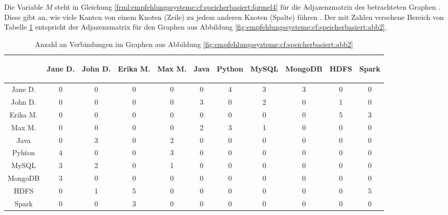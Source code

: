 Die Variable $M$ steht in Gleichung \ref{frml:empfehlungssysteme:cf:speicherbasiert:formel4} für die Adjazenzmatrix des betrachteten Graphen \cite[S. 4]{libenNowell:2007}. Diese gibt an, wie viele Kanten von einem Knoten (Zeile) zu jedem anderen Knoten (Spalte) führen \cite[S. 6]{guns:2014}. Der mit Zahlen versehene Bereich von Tabelle \ref{tbl:empfehlungssysteme:arbeitsweise:tbl2} entspricht der Adjazenzmatrix für den Graphen aus Abbildung \ref{fig:empfehlungssysteme:cf:speicherbasiert:abb2}.

\begin{table}[h]
	\centering
	\begin{tabular}{c|c|c|c|c|c|c|c|c|c|c}
		& \begin{sideways}Jane D.\end{sideways} & \begin{sideways}John D.\end{sideways} & \begin{sideways}Erika M.\end{sideways} & \begin{sideways}Max M.\end{sideways} & \begin{sideways}Java\end{sideways} & \begin{sideways}Python\end{sideways} & \begin{sideways}MySQL\end{sideways} & \begin{sideways}MongoDB\end{sideways} & \begin{sideways}HDFS\end{sideways} & \begin{sideways}Spark\end{sideways} \\
		\hline
		Jane D.  & 0 & 0 & 0 & 0 & 0 & 4 & 3 & 3 & 0 & 0\\
		John D.  & 0 & 0 & 0 & 0 & 3 & 0 & 2 & 0 & 1 & 0\\
		Erika M. & 0 & 0 & 0 & 0 & 0 & 0 & 0 & 0 & 5 & 3\\
		Max M.   & 0 & 0 & 0 & 0 & 2 & 3 & 1 & 0 & 0 & 0\\
		Java     & 0 & 3 & 0 & 2 & 0 & 0 & 0 & 0 & 0 & 0\\
		Pyhton   & 4 & 0 & 0 & 3 & 0 & 0 & 0 & 0 & 0 & 0\\
		MySQL    & 3 & 2 & 0 & 1 & 0 & 0 & 0 & 0 & 0 & 0\\
		MongoDB  & 3 & 0 & 0 & 0 & 0 & 0 & 0 & 0 & 0 & 0\\
		HDFS     & 0 & 1 & 5 & 0 & 0 & 0 & 0 & 0 & 0 & 5\\
		Spark    & 0 & 0 & 3 & 0 & 0 & 0 & 0 & 0 & 0 & 0
	\end{tabular}
	\caption{Anzahl an Verbindungen im Graphen aus Abbildung \ref{fig:empfehlungssysteme:cf:speicherbasiert:abb2}}
	\label{tbl:empfehlungssysteme:arbeitsweise:tbl2}
\end{table}

